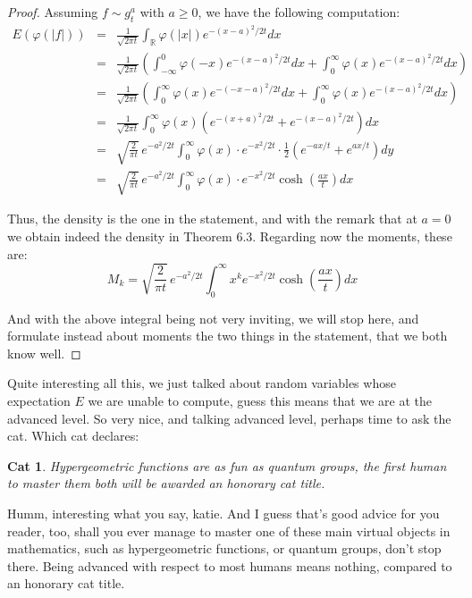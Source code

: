 \documentclass[12pt]{amsbook}
\newtheorem{cat}[theorem]{Cat}
\begin{document}
\begin{proof}
Assuming $f\sim g_t^a$ with $a\geq0$, we have the following computation:
\begin{eqnarray*}
E(\varphi(|f|))
&=&\frac{1}{\sqrt{2\pi t}}\int_\mathbb R\varphi(|x|)e^{-(x-a)^2/2t}dx\\
&=&\frac{1}{\sqrt{2\pi t}}\left(\int_{-\infty}^0\varphi(-x)e^{-(x-a)^2/2t}dx
+\int_0^\infty\varphi(x)e^{-(x-a)^2/2t}dx\right)\\
&=&\frac{1}{\sqrt{2\pi t}}\left(\int_0^\infty\varphi(x)e^{-(-x-a)^2/2t}dx
+\int_0^\infty\varphi(x)e^{-(x-a)^2/2t}dx\right)\\
&=&\frac{1}{\sqrt{2\pi t}}\int_0^\infty\varphi(x)\left(e^{-(x+a)^2/2t}+e^{-(x-a)^2/2t}\right)dx\\
&=&\sqrt{\frac{2}{\pi t}}\,e^{-a^2/2t}\int_0^\infty\varphi(x)\cdot e^{-x^2/2t}
\cdot\frac{1}{2}\left(e^{-ax/t}+e^{ax/t}\right)dy\\
&=&\sqrt{\frac{2}{\pi t}}\,e^{-a^2/2t}\int_0^\infty\varphi(x)\cdot e^{-x^2/2t}\cosh\left(\frac{ax}{t}\right)dx
\end{eqnarray*}

Thus, the density is the one in the statement, and with the remark that at $a=0$ we obtain indeed the density in Theorem 6.3. Regarding now the moments, these are:
$$M_k=\sqrt{\frac{2}{\pi t}}\,e^{-a^2/2t}\int_0^\infty x^ke^{-x^2/2t}\cosh\left(\frac{ax}{t}\right)dx$$

And with the above integral being not very inviting, we will stop here, and formulate instead about moments the two things in the statement, that we both know well.
\end{proof}

Quite interesting all this, we just talked about random variables whose expectation $E$ we are unable to compute, guess this means that we are at the advanced level. So very nice, and talking advanced level, perhaps time to ask the cat. Which cat declares:

\begin{cat}
Hypergeometric functions are as fun as quantum groups, the first human to master them both will be awarded an honorary cat title. 
\end{cat}

Humm, interesting what you say, katie. And I guess that's good advice for you reader, too, shall you ever manage to master one of these main virtual objects in mathematics, such as hypergeometric functions, or quantum groups, don't stop there. Being advanced with respect to most humans means nothing, compared to an honorary cat title.
\end{document}
